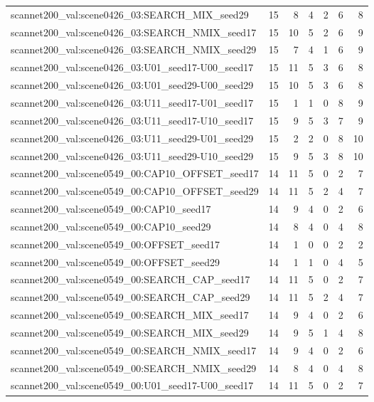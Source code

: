 \begin{table}[t]
\begin{tabular}{lrrrrrr}
scannet200\_val:scene0426\_03:SEARCH\_MIX\_seed29 & 15 & 8 & 4 & 2 & 6 & 8 \\
scannet200\_val:scene0426\_03:SEARCH\_NMIX\_seed17 & 15 & 10 & 5 & 2 & 6 & 9 \\
scannet200\_val:scene0426\_03:SEARCH\_NMIX\_seed29 & 15 & 7 & 4 & 1 & 6 & 9 \\
scannet200\_val:scene0426\_03:U01\_seed17-U00\_seed17 & 15 & 11 & 5 & 3 & 6 & 8 \\
scannet200\_val:scene0426\_03:U01\_seed29-U00\_seed29 & 15 & 10 & 5 & 3 & 6 & 8 \\
scannet200\_val:scene0426\_03:U11\_seed17-U01\_seed17 & 15 & 1 & 1 & 0 & 8 & 9 \\
scannet200\_val:scene0426\_03:U11\_seed17-U10\_seed17 & 15 & 9 & 5 & 3 & 7 & 9 \\
scannet200\_val:scene0426\_03:U11\_seed29-U01\_seed29 & 15 & 2 & 2 & 0 & 8 & 10 \\
scannet200\_val:scene0426\_03:U11\_seed29-U10\_seed29 & 15 & 9 & 5 & 3 & 8 & 10 \\
scannet200\_val:scene0549\_00:CAP10\_OFFSET\_seed17 & 14 & 11 & 5 & 0 & 2 & 7 \\
scannet200\_val:scene0549\_00:CAP10\_OFFSET\_seed29 & 14 & 11 & 5 & 2 & 4 & 7 \\
scannet200\_val:scene0549\_00:CAP10\_seed17 & 14 & 9 & 4 & 0 & 2 & 6 \\
scannet200\_val:scene0549\_00:CAP10\_seed29 & 14 & 8 & 4 & 0 & 4 & 8 \\
scannet200\_val:scene0549\_00:OFFSET\_seed17 & 14 & 1 & 0 & 0 & 2 & 2 \\
scannet200\_val:scene0549\_00:OFFSET\_seed29 & 14 & 1 & 1 & 0 & 4 & 5 \\
scannet200\_val:scene0549\_00:SEARCH\_CAP\_seed17 & 14 & 11 & 5 & 0 & 2 & 7 \\
scannet200\_val:scene0549\_00:SEARCH\_CAP\_seed29 & 14 & 11 & 5 & 2 & 4 & 7 \\
scannet200\_val:scene0549\_00:SEARCH\_MIX\_seed17 & 14 & 9 & 4 & 0 & 2 & 6 \\
scannet200\_val:scene0549\_00:SEARCH\_MIX\_seed29 & 14 & 9 & 5 & 1 & 4 & 8 \\
scannet200\_val:scene0549\_00:SEARCH\_NMIX\_seed17 & 14 & 9 & 4 & 0 & 2 & 6 \\
scannet200\_val:scene0549\_00:SEARCH\_NMIX\_seed29 & 14 & 8 & 4 & 0 & 4 & 8 \\
scannet200\_val:scene0549\_00:U01\_seed17-U00\_seed17 & 14 & 11 & 5 & 0 & 2 & 7 \\

\end{tabular}
\end{table}
